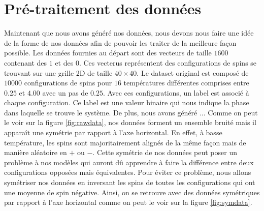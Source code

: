 \documentclass[11pt]{scrartcl} %
\begin{document}
\section{Pré-traitement des données}
Maintenant que nous avons généré nos données, nous devons nous faire une idée de la forme de nos données afin de pouvoir les traiter de la meilleure façon possible.
Les données fournies au départ sont des vecteurs de taille $1600$ contenant des $1$ et des $0$. Ces vecterus représentent des configurations de spins se trouvant sur une grille 2D de taille $40 \times 40$. Le dataset original est composé de $10000$ configurations de spins pour $16$ températures différentes comprises entre $0.25$ et $4.00$ avec un pas de $0.25$.
Avec ces configurations, un label est associé à chaque configuration. Ce label est une valeur binaire qui nous indique la phase dans laquelle se trouve le système. 
De plus, nous avons généré ...
Comme on peut le voir sur la figure \ref{fig:rawdata}, nos données forment un ensemble bruité mais il apparaît une symétrie par rapport à l'axe horizontal. En effet, à basse température, les spins sont majoritairement alignés de la même façon mais de manière aléatoire en $+$ ou $-$.
Cette symétrie de nos données peut poser un problème à nos modèles qui auront dû apprendre à faire la différence entre deux configurations opposées mais équivalentes. Pour éviter ce problème, nous allons symétriser nos données en inversant les spins de toutes les configurations qui ont une moyenne de spin  négative. 
Ainsi, on se retrouve avec des données symétriques par rapport à l'axe horizontal comme on peut le voir sur la figure \ref{fig:symdata}.
\end{document}
